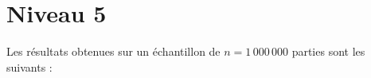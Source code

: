 \section{Niveau 5}
Les résultats obtenues sur un échantillon de $n=1\,000\,000$ parties sont les suivants :

